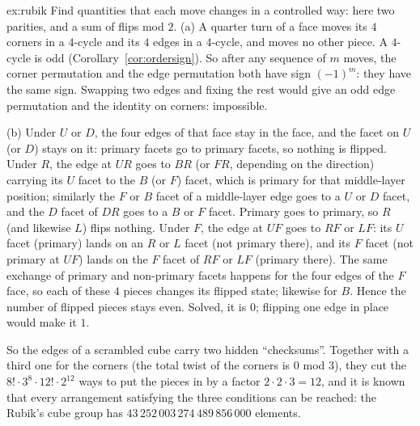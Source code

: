 \begin{solution}{ex:rubik}
\idea Find quantities that each move changes in a controlled way: here two parities, and a sum of flips mod $2$.
\writeup (a) A quarter turn of a face moves its $4$ corners in a $4$-cycle and its $4$ edges in a $4$-cycle, and moves no other piece. A $4$-cycle is odd (Corollary~\ref{cor:ordersign}). So after any sequence of $m$ moves, the corner permutation and the edge permutation both have sign $(-1)^m$: they have the same sign. Swapping two edges and fixing the rest would give an odd edge permutation and the identity on corners: impossible.

(b) Under $U$ or $D$, the four edges of that face stay in the face, and the facet on $U$ (or $D$) stays on it: primary facets go to primary facets, so nothing is flipped. Under $R$, the edge at $UR$ goes to $BR$ (or $FR$, depending on the direction) carrying its $U$ facet to the $B$ (or $F$) facet, which is primary for that middle-layer position; similarly the $F$ or $B$ facet of a middle-layer edge goes to a $U$ or $D$ facet, and the $D$ facet of $DR$ goes to a $B$ or $F$ facet. Primary goes to primary, so $R$ (and likewise $L$) flips nothing. Under $F$, the edge at $UF$ goes to $RF$ or $LF$: its $U$ facet (primary) lands on an $R$ or $L$ facet (not primary there), and its $F$ facet (not primary at $UF$) lands on the $F$ facet of $RF$ or $LF$ (primary there). The same exchange of primary and non-primary facets happens for the four edges of the $F$ face, so each of these $4$ pieces changes its flipped state; likewise for $B$. Hence the number of flipped pieces stays even. Solved, it is $0$; flipping one edge in place would make it $1$.

So the edges of a scrambled cube carry two hidden ``checksums''. Together with a third one for the corners (the total twist of the corners is $0$ mod $3$), they cut the $8!\cdot3^8\cdot12!\cdot2^{12}$ ways to put the pieces in by a factor $2\cdot2\cdot3=12$, and it is known that every arrangement satisfying the three conditions can be reached: the Rubik's cube group has $43\,252\,003\,274\,489\,856\,000$ elements.
\end{solution}


